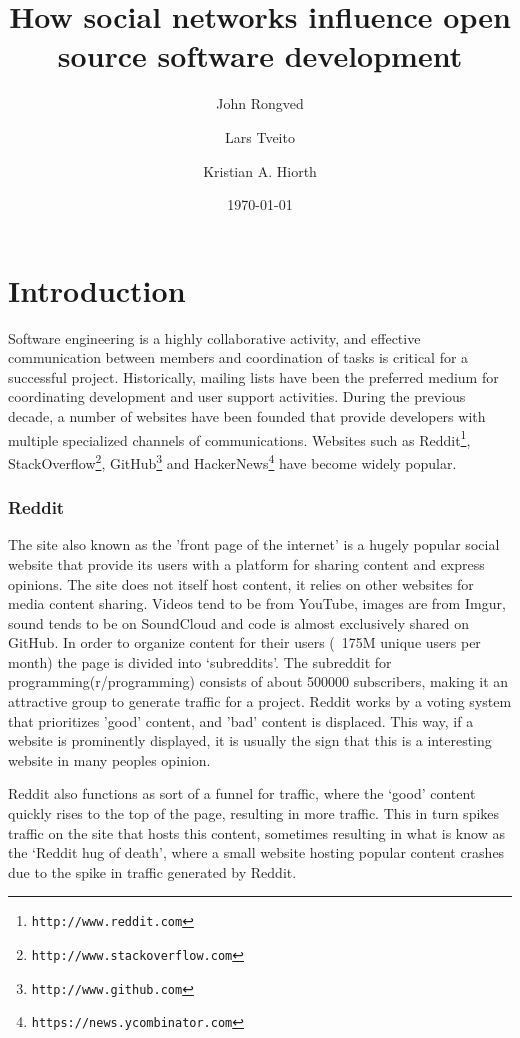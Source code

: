 \documentclass[a4paper,11pt]{article} %
\title{How social networks influence open source software development}
\date{\today}
\author{John Rongved \and Lars Tveito \and Kristian A. Hiorth}
\begin{document}
\ififorside{}

\tableofcontents{}

\section{Introduction}

Software engineering is a highly collaborative activity, and effective communication 
between members and coordination of tasks is critical for a successful project.
Historically, mailing lists have been the preferred medium for coordinating development
and user support activities\cite{Vasilescu14StackOverflow}. 
During the previous decade, a number of websites have been founded that 
provide developers with multiple
specialized channels of communications. Websites such as
Reddit\footnote{\texttt{http://www.reddit.com}},
StackOverflow\footnote{\texttt{http://www.stackoverflow.com}},
GitHub\footnote{\texttt{http://www.github.com}} and
HackerNews\footnote{\texttt{https://news.ycombinator.com}} have become
widely popular. 


\subsubsection*{Reddit}
The site also known as the 'front page of the internet’ is a hugely popular
social website that provide its users with a platform for sharing content
and express opinions. The site does not itself host content, it relies on
other websites for media content sharing. Videos tend to be from YouTube,
images are from Imgur, sound tends to be on SoundCloud and code is almost
exclusively shared on GitHub. In order to organize content for their users
(~175M unique users per month) the page is divided into ‘subreddits’. The
subreddit for programming(r/programming) consists of about \num{500000}
subscribers, making it an attractive group to generate traffic for a
project. %
Reddit works by a voting system that prioritizes 'good' content, and 'bad'
content is displaced. This way, if a website is prominently displayed, it is
usually the sign that this is a interesting website in many peoples opinion.


Reddit also functions as sort of a funnel for traffic, where the ‘good’
content quickly rises to the top of the page, resulting in more
traffic. This in turn spikes traffic on the site that hosts this content,
sometimes resulting in what is know as the ‘Reddit hug of death’, where a
small website hosting popular content crashes due to the spike in traffic
generated by Reddit. %
\end{document}
